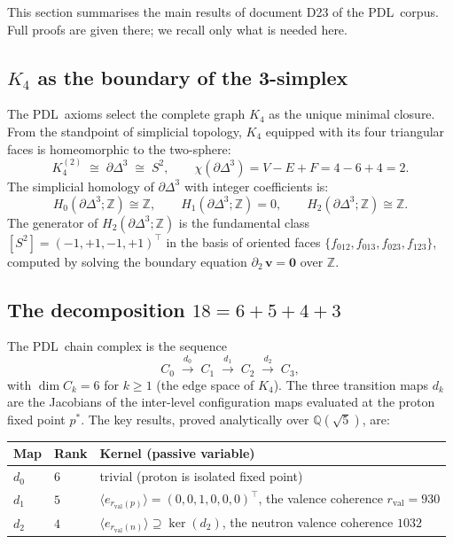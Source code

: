 \documentclass[11pt,a4paper]{article}
\theoremstyle{definition}
\newcommand{\PDL}{\textnormal{PDL}}
\newcommand{\rval}{r_{\mathrm{val}}}
\newcommand{\Kfour}{K_4}
\newcommand{\Sfour}{\partial\Delta^3}
\newcommand{\Hk}[1]{H_{#1}}
\newcommand{\dmap}[1]{d_{#1}}
\begin{document}
This section summarises the main results of document D23 of the \PDL\ corpus.\cite{Topology_18_PDL_2026} Full proofs are given there; we recall only what is needed here.

\subsection{\texorpdfstring{$K_4$}{K4} as the boundary of the 3-simplex}
\label{subsec:K4_S2}

The \PDL\ axioms select the complete graph $\Kfour$ as the unique minimal closure. From the standpoint of simplicial topology, $\Kfour$ equipped with its four triangular faces is homeomorphic to the two-sphere:
\begin{equation}
  \label{eq:K4_S2}
  \Kfour^{(2)} \;\cong\; \Sfour \;\cong\; S^2, \qquad \chi(\Sfour) = V - E + F = 4 - 6 + 4 = 2.
\end{equation}
The simplicial homology of $\Sfour$ with integer coefficients is:\cite{Hatcher_2002}
\[
  \Hk{0}(\Sfour;\mathbb{Z}) \cong \mathbb{Z}, \qquad \Hk{1}(\Sfour;\mathbb{Z}) = 0, \qquad \Hk{2}(\Sfour;\mathbb{Z}) \cong \mathbb{Z}.
\]
The generator of $\Hk{2}(\Sfour;\mathbb{Z})$ is the fundamental class $[S^2] = (-1,+1,-1,+1)^\top$ in the basis of oriented faces $\{f_{012}, f_{013}, f_{023}, f_{123}\}$, computed by solving the boundary equation $\partial_2\,\mathbf{v} = \mathbf{0}$ over $\mathbb{Z}$.

\subsection{The decomposition \texorpdfstring{$18 = 6+5+4+3$}{18 = 6+5+4+3}}
\label{subsec:decomp18}

The \PDL\ chain complex is the sequence
\[
  C_0 \;\xrightarrow{\dmap{0}}\; C_1 \;\xrightarrow{\dmap{1}}\; C_2 \;\xrightarrow{\dmap{2}}\; C_3,
\]
with $\dim C_k = 6$ for $k \geq 1$ (the edge space of $\Kfour$). The three transition maps $\dmap{k}$ are the Jacobians of the inter-level configuration maps evaluated at the proton fixed point $p^*$. The key results, proved analytically over $\mathbb{Q}(\sqrt{5})$, are:

\begin{center}
\begin{tabular}{lll}
\toprule
Map & Rank & Kernel (passive variable) \\
\midrule
$\dmap{0}$ & $6$ & trivial (proton is isolated fixed point) \\
$\dmap{1}$ & $5$ & $\langle e_{\rval(p)}\rangle = (0,0,1,0,0,0)^\top$, the valence coherence $\rval = 930$ \\
$\dmap{2}$ & $4$ & $\langle e_{\rval(n)}\rangle \supseteq \ker(\dmap{2})$, the neutron valence coherence $1032$ \\
\bottomrule
\end{tabular}
\end{center}
\end{document}
